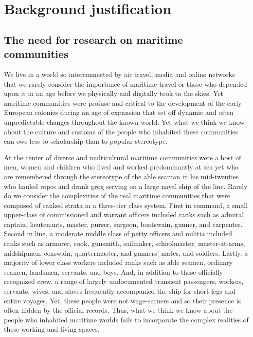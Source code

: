 \section{\textbf{Background} \textbf{justification} }%



\subsection{\textbf{The} \textbf{need} \textbf{for} \textbf{research} \textbf{on} \textbf{maritime} \textbf{communities}}%



We live in a world so interconnected by air travel, media and online networks that we rarely consider the importance of maritime travel or those who depended upon it in an age before we physically and digitally took to the skies. Yet maritime communities were profuse and critical to the development of the early European colonies during an age of expansion that set off dynamic and often unpredictable changes throughout the known world. Yet what we think we know about the culture and customs of the people who inhabited these communities can owe less to scholarship than to popular stereotype. 



At the center of diverse and multicultural maritime communities were a host of men, women and children who lived and worked predominantly at sea yet who are remembered through the stereotype of the able seaman in his mid-twenties who hauled ropes and drank grog serving on a large naval ship of the line. Rarely do we consider the complexities of the real maritime communities that were composed of ranked strata in a three-tier class system. First in command, a small upper-class of commissioned and warrant officers included ranks such as admiral, captain, lieutenants, master, purser, surgeon, boatswain, gunner, and carpenter. Second in line, a moderate middle class of petty officers and militia included ranks such as armorer, cook, gunsmith, sailmaker, schoolmaster, master-at-arms, midshipmen, coxswain, quartermaster, and gunners’ mates, and soldiers. Lastly, a majority of lower class workers included ranks such as able seamen, ordinary seamen, landsmen, servants, and boys. And, in addition to these officially recognized crew, a range of largely undocumented transient passengers, workers, servants, wives, and slaves frequently accompanied the ship for short legs and entire voyages. Yet, these people were not wage-earners and so their presence is often hidden by the official records. Thus, what we think we know about the people who inhabited maritime worlds fails to incorporate the complex realities of these working and living spaces.  



